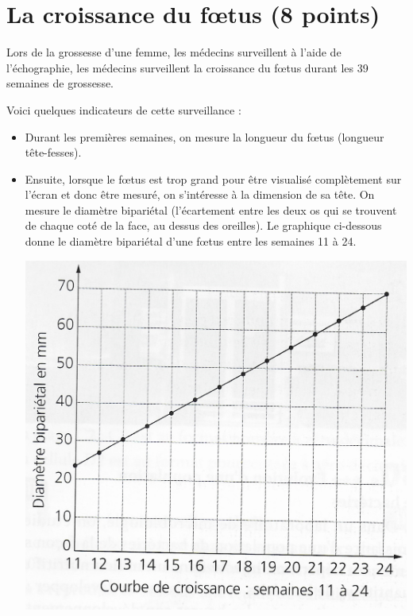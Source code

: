\section{La croissance du f\oe tus (8 points)}

Lors de la grossesse d'une femme, les médecins surveillent à l'aide de l'échographie, les médecins surveillent la croissance du f\oe tus durant les 39 semaines de grossesse.

Voici quelques indicateurs de cette surveillance :
\begin{itemize}
	\item Durant les premières semaines, on mesure la longueur du f\oe tus (longueur tête-fesses).
	\item Ensuite, lorsque le f\oe tus est trop grand pour être visualisé complètement sur l'écran et donc être mesuré, on s'intéresse à la dimension de sa tête. On mesure le diamètre bipariétal (l'écartement entre les deux os qui se trouvent de chaque coté de la face, au dessus des oreilles). Le graphique ci-dessous donne le diamètre bipariétal d'une f\oe tus entre les semaines 11 à 24.
	
	\begin{center}
		\includegraphics[scale=0.2]{graph_foetus}
	\end{center}

\end{itemize}


